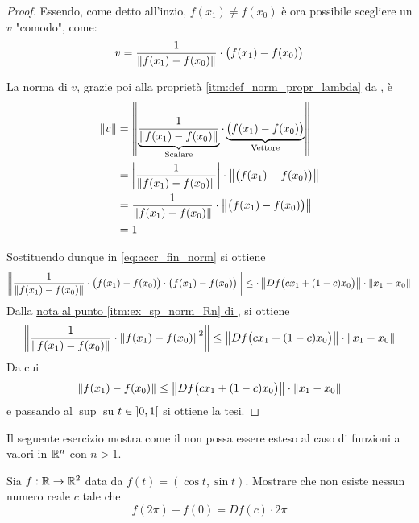\begin{theorem}
\begin{proof}
		Essendo, come detto all'inzio, $f(x_1) \neq f(x_0)$ è ora possibile scegliere un $v$ "comodo", come:
		\[v = \frac{1}{\left\|f(x_1) - f(x_0)\right\|} \cdot \bigl( f(x_1) - f(x_0) \bigr)\]
		\begin{note}
			La norma di $v$, grazie poi alla proprietà \ref{itm:def_norm_propr_lambda} da , è
			\begin{align*}
				\left\|v\right\| &= \left\|
					\underbrace{\frac{1}{\left\|f(x_1) - f(x_0)\right\|}}_{\text{Scalare}}
					\cdot
					\underbrace{\bigl( f(x_1) - f(x_0) \bigr)}_{\text{Vettore}}
					\right\|\\
				&= \left|\frac{1}{\left\|f(x_1) - f(x_0)\right\|}\right| \cdot \left\|\bigl( f(x_1) - f(x_0) \bigr)\right\|\\
				&= \frac{1}{\left\|f(x_1) - f(x_0)\right\|} \cdot \left\|\bigl( f(x_1) - f(x_0) \bigr)\right\|\\
				&= 1
			\end{align*}
		\end{note}
		Sostituendo dunque in \cref{eq:accr_fin_norm} si ottiene
		\[\left\|\frac{1}{\left\|f(x_1) - f(x_0)\right\|} \cdot \bigl( f(x_1) - f(x_0) \bigr) \cdot \bigl( f(x_1) - f(x_0) \bigr)\right\| \leq \cdot \left\|Df\bigl( cx_1 + (1-c)x_0 \bigr)\right\| \cdot \left\|x_1 - x_0\right\|\]
		Dalla \hyperlink{note:ex_sp_norm_Rn}{nota al punto \ref*{itm:ex_sp_norm_Rn} di }, si ottiene
		\[\left\|\frac{1}{\left\|f(x_1) - f(x_0)\right\|} \cdot \left\|f(x_1) - f(x_0)\right\|^2\right\| \leq \left\|Df\bigl( cx_1 + (1-c)x_0 \bigr)\right\| \cdot \left\|x_1 - x_0\right\|\]
		Da cui
		\[\left\|f(x_1) - f(x_0)\right\| \leq \left\|Df\bigl( cx_1 + (1-c)x_0 \bigr)\right\| \cdot \left\|x_1 - x_0\right\|\]
		e passando al $\sup$ su $t \in \left]0,1\right[$ si ottiene la tesi.
	\end{proof}
\end{theorem}
Il seguente esercizio mostra come il  non possa essere esteso al caso di funzioni a valori in $\mathbb{R}^n$ con $n > 1$.
\begin{exercise}
	Sia $f: \mathbb{R} \to \mathbb{R}^2$ data da $f(t) = (\cos t, \sin t)$. Mostrare che non esiste nessun numero reale $c$ tale che
	\[f(2 \pi) - f(0) = Df(c) \cdot 2 \pi\]
\end{exercise}

